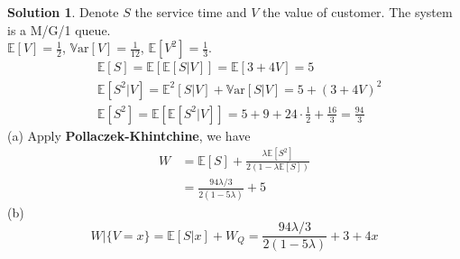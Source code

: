 \documentclass[a4paper, 10pt]{article}
\theoremstyle{definition}
\theoremstyle{hSol}
\newtheorem*{solution}{Solution}
\begin{document}
\begin{solution} Denote $S$ the service time and $V$ the value of customer. The system is a M/G/1 queue. \\
$\mathbb{E}\left[V\right]=\frac{1}{2}$, $\mathrm{\mathbb{V}ar}\left[V\right]=\frac{1}{12}$, $\mathbb{E}\left[V^2\right]=\frac{1}{3}$.
\begin{equation}
  \begin{split}
    &\mathbb{E}\left[S\right] = \mathbb{E}\left[\mathbb{E}\left[S|V\right]\right] = \mathbb{E}\left[3+4V\right] = 5 \\
    &\mathbb{E}\left[S^2|V\right] = \mathbb{E}^2\left[S|V\right] + \mathrm{\mathbb{V}ar}\left[S|V\right] = 5+(3+4V)^2 \\
    &\mathbb{E}\left[S^2\right] = \mathbb{E}\left[\mathbb{E}\left[S^2|V\right]\right] = 5+9+24\cdot\frac{1}{2}+\frac{16}{3} = \frac{94}{3}
  \end{split}
\end{equation}
(a) Apply \textbf{Pollaczek-Khintchine}, we have
\begin{equation}
  \begin{split}
    W &= \mathbb{E}\left[S\right] + \frac{\lambda \mathbb{E}\left[S^2\right]}{2(1- \lambda \mathbb{E}\left[S\right])} \\
    &= \frac{94 \lambda/ 3}{2(1-5 \lambda)} +5
  \end{split}
\end{equation}
(b)
\begin{equation}
  W|\{V=x\} = \mathbb{E}\left[S|x\right] + W_Q = \frac{94 \lambda/ 3}{2(1-5 \lambda)} + 3+4x
\end{equation}
\end{solution}
\end{document}
